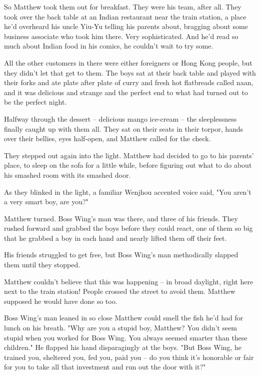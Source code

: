 So Matthew took them out for breakfast. They were his team, after
all. They took over the back table at an Indian restaurant near the
train station, a place he'd overheard his uncle Yiu-Yu telling his
parents about, bragging about some business associate who took him
there. Very sophisticated. And he'd read so much about Indian food
in his comics, he couldn't wait to try some.

All the other customers in there were either foreigners or Hong
Kong people, but they didn't let that get to them. The boys sat at
their back table and played with their forks and ate plate after
plate of curry and fresh hot flatbreads called naan, and it was
delicious and strange and the perfect end to what had turned out to
be the perfect night.

Halfway through the dessert -- delicious mango ice-cream -- the
sleeplessness finally caught up with them all. They sat on their
seats in their torpor, hands over their bellies, eyes half-open,
and Matthew called for the check.

They stepped out again into the light. Matthew had decided to go to
his parents' place, to sleep on the sofa for a little while, before
figuring out what to do about his smashed room with its smashed
door.

As they blinked in the light, a familiar Wenjhou accented voice
said, "You aren't a very smart boy, are you?"

Matthew turned. Boss Wing's man was there, and three of his
friends. They rushed forward and grabbed the boys before they could
react, one of them so big that he grabbed a boy in each hand and
nearly lifted them off their feet.

His friends struggled to get free, but Boss Wing's man methodically
slapped them until they stopped.

Matthew couldn't believe that this was happening -- in broad
daylight, right here next to the train station! People crossed the
street to avoid them. Matthew supposed he would have done so too.

Boss Wing's man leaned in so close Matthew could smell the fish
he'd had for lunch on his breath. "Why are you a stupid boy,
Matthew? You didn't seem stupid when you worked for Boss Wing. You
always seemed smarter than these children." He flapped his hand
disparagingly at the boys. "But Boss Wing, he trained you,
sheltered you, fed you, paid you -- do you think it's honorable or
fair for you to take all that investment and run out the door with
it?"

